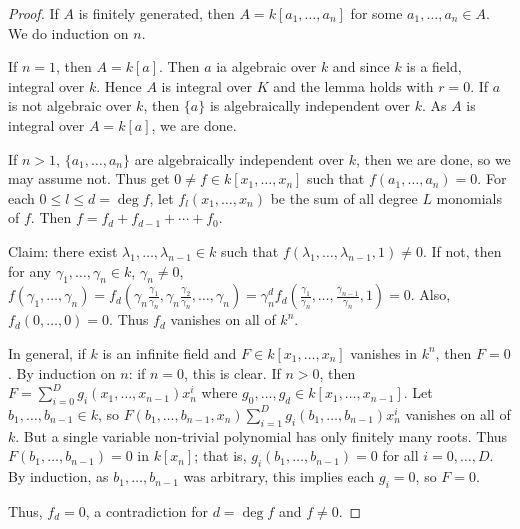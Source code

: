 \documentclass[11pt, a4paper]{memoir}
\theoremstyle{change}
\theoremstyle{plain}
\theoremstyle{nonumberplain}
\newtheorem{proof}{Proof}
\numberwithin{equation}{section}
\begin{document}
\begin{proof}
    If $A$ is finitely generated, then $A=k[a_1,\ldots,a_n]$ for some $a_1,\ldots,a_n\in A$.
    We do induction on $n$.

    If $n=1$, then $A=k[a]$.
    Then $a$ ia algebraic over $k$ and since $k$ is a field, integral over $k$.
    Hence $A$ is integral over $K$ and the lemma holds with $r=0$.
    If $a$ is not algebraic over $k$, then $\{a\}$ is algebraically independent over $k$.
    As $A$ is integral over $A=k[a]$, we are done.

    If $n>1$, $\{a_1,\ldots,a_n\}$ are algebraically independent over $k$, then we are done, so we may assume not.
    Thus get $0\neq f\in k[x_1,\ldots,x_n]$ such that $f(a_1,\ldots,a_n)=0$.
    For each $0\leq l\leq d=\deg f$, let $f_l(x_1,\ldots,x_n)$ be the sum of all degree $L$ monomials of $f$.
    Then $f=f_d+f_{d-1}+\cdots+f_0$.

    Claim: there exist $\lambda_1,\ldots,\lambda_{n-1}\in k$ such that $f(\lambda_1,\ldots,\lambda_{n-1},1)\neq 0$.
    If not, then for any $\gamma_1,\ldots,\gamma_n\in k$, $\gamma_n\neq 0$, $f(\gamma_1,\ldots,\gamma_n)=f_d(\gamma_n\frac{\gamma_1}{\gamma_n},\gamma_n\frac{\gamma_2}{\gamma_n},\ldots,\gamma_n)=\gamma_n^df_d\left(\frac{\gamma_1}{\gamma_n},\ldots,\frac{\gamma_{n-1}}{\gamma_n},1\right)=0$.
    Also, $f_d(0,\ldots,0)=0$.
    Thus $f_d$ vanishes on all of $k^n$.

    In general, if $k$ is an infinite field and $F\in k[x_1,\ldots,x_n]$ vanishes in $k^n$, then $F=0$.
    By induction on $n$: if $n=0$, this is clear.
    If $n>0$, then $F=\sum_{i=0}^D g_i(x_1,\ldots,x_{n-1})x_n^i$ where $g_0,\ldots,g_d\in k[x_1,\ldots,x_{n-1}]$.
    Let $b_1,\ldots,b_{n-1}\in k$, so $F(b_1,\ldots,b_{n-1},x_n)\sum_{i=1}^D g_i(b_1,\ldots,b_{n-1})x_n^i$ vanishes on all of $k$.
    But a single variable non-trivial polynomial has only finitely many roots.
    Thus $F(b_1,\ldots,b_{n-1})=0$ in $k[x_n]$; that is, $g_i(b_1,\ldots,b_{n-1})=0$ for all $i=0,\ldots,D$.
    By induction, as $b_1,\ldots,b_{n-1}$ was arbitrary, this implies each $g_i=0$, so $F=0$.

    Thus, $f_d=0$, a contradiction for $d=\deg f$ and $f\neq 0$.


\end{proof}
\end{document}
